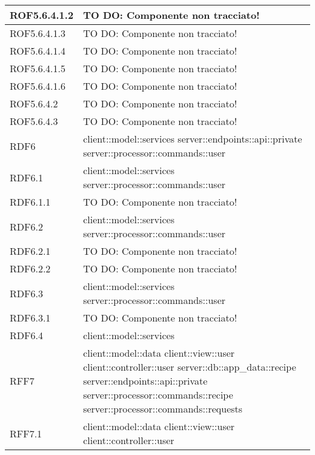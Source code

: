 \begin{center}
\begin{longtable}{| p{4cm} | p{8cm} |}
\hline
ROF5.6.4.1.2 & TO DO: Componente non tracciato! \\
\hline
ROF5.6.4.1.3 & TO DO: Componente non tracciato! \\
\hline
ROF5.6.4.1.4 & TO DO: Componente non tracciato! \\
\hline
ROF5.6.4.1.5 & TO DO: Componente non tracciato! \\
\hline
ROF5.6.4.1.6 & TO DO: Componente non tracciato! \\
\hline
ROF5.6.4.2 & TO DO: Componente non tracciato! \\
\hline
ROF5.6.4.3 & TO DO: Componente non tracciato! \\
\hline
RDF6 & client::model::services \newline server::endpoints::api::private \newline server::processor::commands::user \\
\hline
RDF6.1 & client::model::services \newline server::processor::commands::user \\
\hline
RDF6.1.1 & TO DO: Componente non tracciato! \\
\hline
RDF6.2 & client::model::services \newline server::processor::commands::user \\
\hline
RDF6.2.1 & TO DO: Componente non tracciato! \\
\hline
RDF6.2.2 & TO DO: Componente non tracciato! \\
\hline
RDF6.3 & client::model::services \newline server::processor::commands::user \\
\hline
RDF6.3.1 & TO DO: Componente non tracciato! \\
\hline
RDF6.4 & client::model::services \\
\hline
RFF7 & client::model::data \newline client::view::user \newline client::controller::user \newline server::db::app\_data::recipe \newline server::endpoints::api::private \newline server::processor::commands::recipe \newline server::processor::commands::requests \\
\hline
RFF7.1 & client::model::data \newline client::view::user \newline client::controller::user \\

\end{longtable}
\end{center}
